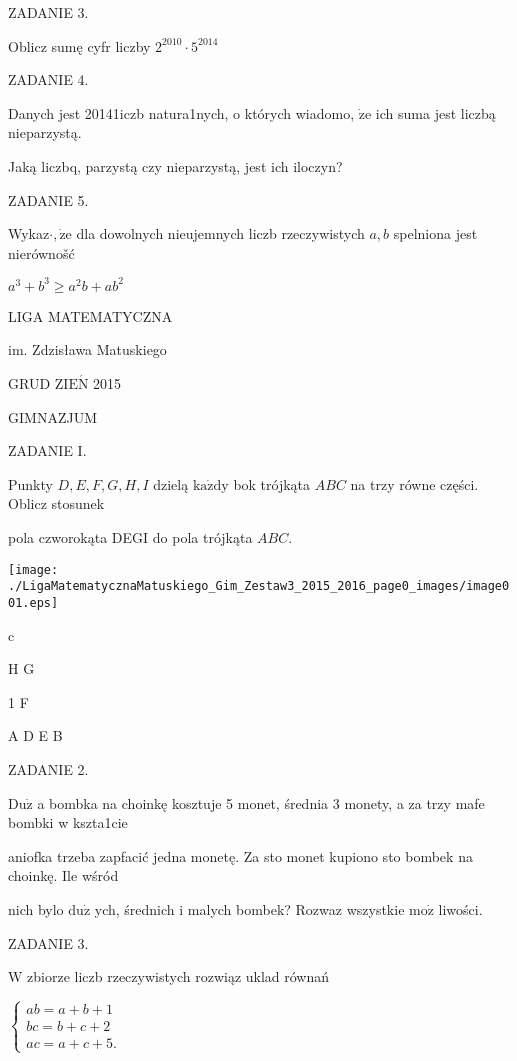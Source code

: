 \documentclass[a4paper,12pt]{article}
\begin{document}
ZADANIE 3.

Oblicz sumę cyfr liczby $2^{2010}\cdot 5^{2014}$

ZADANIE 4.

Danych jest 20141iczb natura1nych, o których wiadomo, $\dot{\mathrm{z}}\mathrm{e}$ ich suma jest liczbą nieparzystą.

Jaką liczbq, parzystą czy nieparzystą, jest ich iloczyn?

ZADANIE 5.

Wykaz$\cdot, \dot{\mathrm{z}}\mathrm{e}$ dla dowolnych nieujemnych liczb rzeczywistych $a, b$ spelniona jest nierównošć

$a^{3}+b^{3}\geq a^{2}b+ab^{2}$






LIGA MATEMATYCZNA

im. Zdzisława Matuskiego

GRUD Z$\mathrm{I}\mathrm{E}\acute{\mathrm{N}}$ 2015

GIMNAZJUM

ZADANIE I.

Punkty $D, E, F, G, H, I$ dzielą $\mathrm{k}\mathrm{a}\dot{\mathrm{z}}\mathrm{d}\mathrm{y}$ bok trójkąta $ABC$ na trzy równe części. Oblicz stosunek

pola czworokąta DEGI do pola trójkąta $ABC.$
\begin{center}
\texttt{[image: ./LigaMatematycznaMatuskiego\_Gim\_Zestaw3\_2015\_2016\_page0\_images/image001.eps]}
\end{center}
c

H G

1  F

A  D E  B

ZADANIE 2.

$\mathrm{D}\mathrm{u}\dot{\mathrm{z}}$ a bombka na choinkę kosztuje 5 monet, średnia 3 monety, a za trzy mafe bombki w kszta1cie

aniofka trzeba zapfacić jedna monetę. Za sto monet kupiono sto bombek na choinkę. Ile wśród

nich bylo $\mathrm{d}\mathrm{u}\dot{\mathrm{z}}$ ych, średnich i malych bombek? Rozwaz wszystkie $\mathrm{m}\mathrm{o}\dot{\mathrm{z}}$ liwości.

ZADANIE 3.

$\mathrm{W}$ zbiorze liczb rzeczywistych rozwiąz uklad równań

$\left\{\begin{array}{l}
ab=a+b+1\\
bc=b+c+2\\
ac=a+c+5.
\end{array}\right.$
\end{document}
